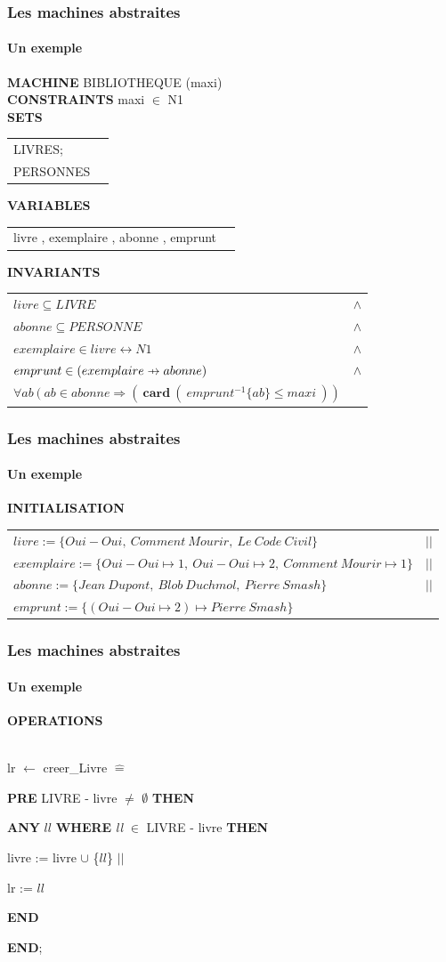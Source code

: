 \documentclass[11pt,a4paper,xcolor=table]{beamer} %
\newcommand{\Bequal}{\mathrel{\widehat{=}}}
\def\p#1{\mathrel{\ooalign{\hfil$\mapstochar\mkern 5mu$\hfil\cr$#1$}}}
\def \pfun  {\p\rightarrow}
\begin{document}
\begin{frame}
\frametitle{Les machines abstraites}
\framesubtitle{Un exemple}
\setlength{\LTpre}{\medskipamount}
\setlength{\LTpost}{0pt}
\setlength\LTleft{\parindent}
\textbf{MACHINE}  BIBLIOTHEQUE (maxi) \\
\noindent\textbf{CONSTRAINTS} maxi $\in$ N1 \\
\noindent\textbf{SETS}
\begin{longtable}{ll} LIVRES; \\ PERSONNES\\ \end{longtable}
\noindent\textbf{VARIABLES}
\begin{longtable}{ll} livre , exemplaire , abonne , emprunt \end{longtable}
\noindent\textbf{INVARIANTS}
\begin{longtable}{ll}
$livre \subseteq LIVRE $ & $\wedge$ \tabularnewline
$abonne \subseteq PERSONNE$ & $\wedge$ \tabularnewline
$exemplaire \in livre \leftrightarrow N1$ & $\wedge$ \tabularnewline
$emprunt \in ( exemplaire \pfun abonne )$ & $\wedge$ \tabularnewline
$\forall ab\ (\ ab \in abonne \Rightarrow (\ \textbf{card}\ (\ emprunt ^{-1}\{ab\} \leq maxi\ ))$ &
\end{longtable}
\end{frame}

\begin{frame}
\frametitle{Les machines abstraites}
\framesubtitle{Un exemple}
\noindent\textbf{INITIALISATION}
\begin{longtable}{ll}
$livre := \{Oui-Oui,\ Comment\ Mourir,\ Le\ Code\ Civil\} $& $||$ \tabularnewline
$exemplaire := \{Oui-Oui \mapsto 1,\ Oui-Oui \mapsto 2,\ Comment\ Mourir \mapsto 1\}$ & $||$ \tabularnewline
$abonne := \{Jean\ Dupont,\ Blob\ Duchmol,\ Pierre\ Smash\} $& $||$ \tabularnewline
$emprunt := \{( Oui-Oui \mapsto 2)  \mapsto Pierre\ Smash \}$ &
\end{longtable}
\end{frame}

\begin{frame}
\frametitle{Les machines abstraites}
\framesubtitle{Un exemple}
\noindent \textbf{OPERATIONS}

~\\
\indent lr $\leftarrow$ creer\_Livre $\Bequal$

\textbf{PRE} LIVRE - livre $\neq$ $\emptyset$ \textbf{THEN}

\hspace*{1em} \textbf{ANY} $ll$ \textbf{WHERE}  \emph{ll} $\in$ LIVRE - livre \textbf{THEN} 

\hspace*{2em}  livre := livre $\cup$ \{$ll$\} $||$ 

\hspace*{2em} lr := $ll$

\hspace*{1em} \textbf{END}

\textbf{END};

\end{frame}
\end{document}
